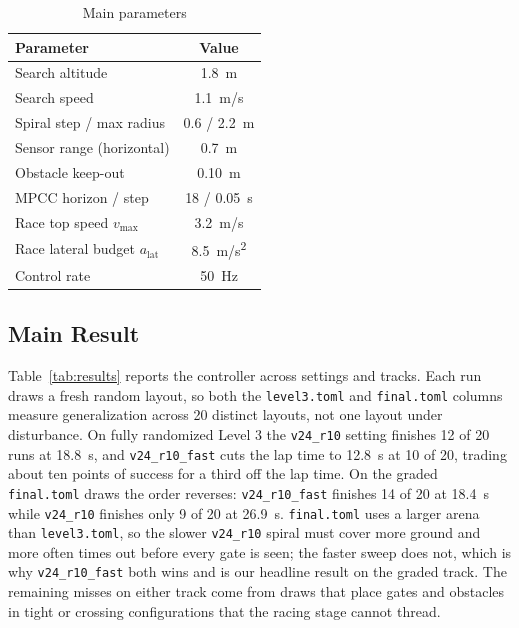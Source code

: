 \documentclass[conference]{IEEEtran}
\begin{document}
\begin{table}[htbp]
\caption{Main parameters}
\begin{center}
\begin{tabular}{|l|c|}
\hline
\textbf{Parameter} & \textbf{Value} \\
\hline
Search altitude & 1.8~m \\
\hline
Search speed & 1.1~m/s \\
\hline
Spiral step / max radius & 0.6 / 2.2~m \\
\hline
Sensor range (horizontal) & 0.7~m \\
\hline
Obstacle keep-out & 0.10~m \\
\hline
MPCC horizon / step & 18 / 0.05~s \\
\hline
Race top speed $v_{\max}$ & 3.2~m/s \\
\hline
Race lateral budget $a_{\text{lat}}$ & 8.5~m/s\textsuperscript{2} \\
\hline
Control rate & 50~Hz \\
\hline
\end{tabular}
\label{tab:params}
\end{center}
\end{table}

\subsection{Main Result}
Table~\ref{tab:results} reports the controller across settings and tracks. Each run draws a fresh random layout, so both the \texttt{level3.toml} and \texttt{final.toml} columns measure generalization across 20 distinct layouts, not one layout under disturbance. On fully randomized Level 3 the \texttt{v24\_r10} setting finishes 12 of 20 runs at 18.8~s, and \texttt{v24\_r10\_fast} cuts the lap time to 12.8~s at 10 of 20, trading about ten points of success for a third off the lap time. On the graded \texttt{final.toml} draws the order reverses: \texttt{v24\_r10\_fast} finishes 14 of 20 at 18.4~s while \texttt{v24\_r10} finishes only 9 of 20 at 26.9~s. \texttt{final.toml} uses a larger arena than \texttt{level3.toml}, so the slower \texttt{v24\_r10} spiral must cover more ground and more often times out before every gate is seen; the faster sweep does not, which is why \texttt{v24\_r10\_fast} both wins and is our headline result on the graded track. The remaining misses on either track come from draws that place gates and obstacles in tight or crossing configurations that the racing stage cannot thread.
\end{document}
